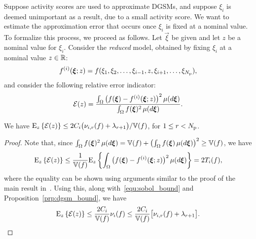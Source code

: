 Suppose activity scores
are used to approximate DGSMs, and suppose
$\xi_i$ is
deemed unimportant as a result, due to a small activity score. 
We want to estimate
the approximation error that occurs once $\xi_i$ is fixed at a nominal value.
%
To formalize this process, we proceed as follows.
Let $\vec\xi$ be given and let $z$ be a nominal value for $\xi_i$.  
Consider the \emph{reduced} model, 
obtained by fixing $\xi_i$ at a nominal value $z \in \R$: 
\[
\redf{i}{z} = f(\xi_1, \xi_2, \ldots, \xi_{i-1}, z, \xi_{i+1}, \ldots, \xi_\Np),
\] 
and consider the following relative error indicator:
\[
\mathcal{E}(z) =
\frac{ \int_\Omega \big( f(\vec\xi) - \redf{i}{z}\big)^2 \, \mu(d\vec\xi) }
          {\int_\Omega f(\vec\xi)^2 \, \mu(d\vec\xi)}.
\] 
\begin{theorem}\label{thm:error_estimate}
We have $\Ez{ \mathcal{E}(z)} \leq 2C_i\big(\act{f}{i}{r} + \lambda_{r+1}\big)/{\V(f)}$, 
for $1 \leq r < \Np$.
\end{theorem}
%
\begin{proof} 
Note that, since 
$\int_\Omega f(\vec\xi)^2 \, \mu(d\vec\xi) = \V(f) + 
\left(\int_\Omega f(\vec\xi) \, \mu(d\vec\xi)\right)^2 \geq \V(f)$, we have
\[
\Ez{ \mathcal{E}(z)} \leq \frac{1}{\V(f)} \Ez{ 
\int_\Omega \big( f(\vec\xi) - \redf{i}{z}\big)^2 \, \mu(d\vec\xi)}
= 2 T_i(f), 
\]
where the equality can be shown using arguments similar to the proof of the main result 
in~\cite{SobolTarantolaGatelliEtAl07}. Using this, along with~\eqref{equ:sobol_bound} and
Proposition~\ref{prp:dgsm_bound}, we have 
\[
\Ez{ \mathcal{E}(z)} \leq 
\frac{2C_i}{\V(f)}\nu_i(f)
\leq 
\frac{2C_i}{\V(f)}\big[\act{f}{i}{r} + \lambda_{r+1}\big]. \qedhere
\]
\end{proof}

